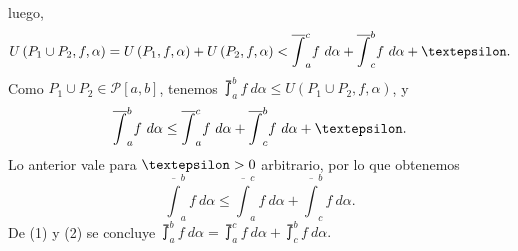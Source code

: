   luego,
  \begin{equation*}
    U\left(P_1\cup P_2,f,\alpha\right) = U\left(P_1,f,\alpha\right)+U\left(P_2,f,\alpha\right) < \overline{\int}_a^c f\ d\alpha + \overline{\int}_c^b f\ d\alpha + \text{\textepsilon}.
  \end{equation*}
  Como $P_1\cup P_2\in\mathcal{P}\left[a,b\right]$, tenemos $\upint_a^b f\ d\alpha \leq U\left(P_1\cup P_2,f,\alpha\right)$, y
  \begin{equation*}
    \overline{\int}_a^b f\ d\alpha \leq \overline{\int}_a^c f\ d\alpha + \overline{\int}_c^b f\ d\alpha +\text{\textepsilon}.
  \end{equation*}
  Lo anterior vale para $\text{\textepsilon}>0$ arbitrario, por lo que obtenemos
  \setcounter{equation}{1}
  \begin{equation}
    \overline{\int}_a^b f\ d\alpha \leq \overline{\int}_a^c f\ d\alpha + \overline{\int}_c^b f\ d\alpha.
  \end{equation}
  De (1) y (2) se concluye $\upint_a^b f\ d\alpha = \upint_a^c f\ d\alpha + \upint_c^b f\ d\alpha.$

